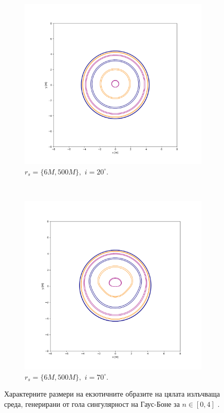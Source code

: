 \begin{figure}[!htb]
	\centering
	\begin{subfigure}{6cm}
		\includegraphics[scale = 0.25]{GB_20_deg_r6_500_gamma_1.15.png}
		\caption{$r_s = \{6M, 500M\},\,\, i = 20^\circ$.}
	\end{subfigure}\,\,\,
	\begin{subfigure}{6cm}
		\includegraphics[scale = 0.25]{GB_70_deg_r6_500_gamma_1.15.png}
		\caption{$r_s = \{6M, 500M\},\,\, i = 70^\circ$.}
	\end{subfigure}
	\caption[Характерните размери на екзотичните образите на цялата излъчваща среда, генерирани от гола сингулярност на Гаус-Боне.]{\small Характерните размери на екзотичните образите на цялата излъчваща среда, генерирани от гола сингулярност на Гаус-Боне за $n\in[0, 4]$ \cite{Gyulchev2021}.} 
	\label{GB_img_size_deg}
\end{figure}

